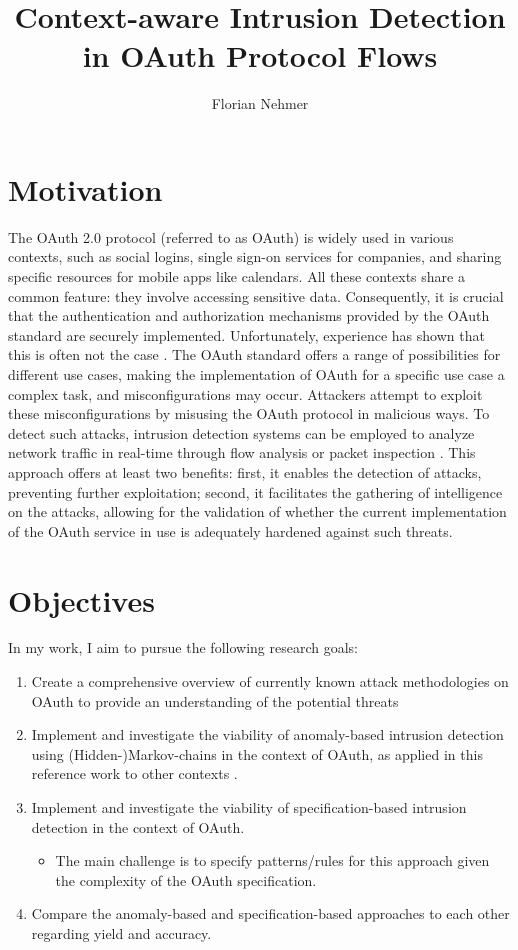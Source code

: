 \documentclass{article}
\title{Context-aware Intrusion Detection in OAuth Protocol Flows}
\author{Florian Nehmer}
\begin{document}
\maketitle

\section{Motivation}
The OAuth 2.0 protocol \cite{rfc6749} (referred to as OAuth) is widely used in various contexts, such as social logins, single sign-on services for companies, and sharing specific resources for mobile apps like calendars. All these contexts share a common feature: they involve accessing sensitive data. Consequently, it is crucial that the authentication and authorization mechanisms provided by the OAuth standard are securely implemented. Unfortunately, experience has shown that this is often not the case \cite{Li2019}. The OAuth standard offers a range of possibilities for different use cases, making the implementation of OAuth for a specific use case a complex task, and misconfigurations may occur. Attackers attempt to exploit these misconfigurations by misusing the OAuth protocol in malicious ways. To detect such attacks, intrusion detection systems can be employed to analyze network traffic in real-time through flow analysis or packet inspection \cite{Liu2019}. This approach offers at least two benefits: first, it enables the detection of attacks, preventing further exploitation; second, it facilitates the gathering of intelligence on the attacks, allowing for the validation of whether the current implementation of the OAuth service in use is adequately hardened against such threats.

\section{Objectives}
In my work, I aim to pursue the following research goals:

\begin{enumerate}
    \item Create a comprehensive overview of currently known attack methodologies on OAuth to provide an understanding of the potential threats
    \item Implement and investigate the viability of anomaly-based intrusion detection using (Hidden-)Markov-chains in the context of OAuth, as applied in this reference work to other contexts \cite{sperotto2011}.
    \item Implement and investigate the viability of specification-based intrusion detection in the context of OAuth.
    \begin{itemize}
        \item The main challenge is to specify patterns/rules for this approach given the complexity of the OAuth specification.
    \end{itemize}
    \item Compare the anomaly-based and specification-based approaches to each other regarding yield and accuracy.
\end{enumerate}
\end{document}

